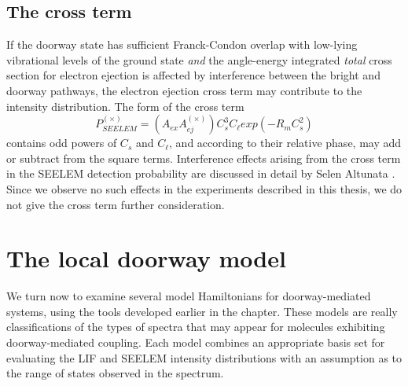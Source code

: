 \documentclass[12pt]{mitthesis}
\begin{document}
\subsection{The cross term}

If the doorway state has sufficient Franck-Condon overlap with
low-lying vibrational levels of the ground state \emph{and} the
angle-energy integrated \emph{total} cross section for electron
ejection is affected by interference between the bright and doorway
pathways, the electron ejection cross term may contribute to the
intensity distribution. The form of the cross term
\begin{equation}
  P_{SEELEM}^{(\times)} = \left( A_{ex} A_{ej}^{(\times)} \right)
    C_s^3 C_\ell exp \left( -R_m C_s^2 \right)
\end{equation}
contains odd powers of $C_s$ and $C_{\ell}$, and according to their
relative phase, may add or subtract from the square terms.
Interference effects arising from the cross term in the SEELEM
detection probability are discussed in detail by Selen Altunata
\cite{altunata00, altunata02, altunata-thesis}.  Since we observe no
such effects in the experiments described in this thesis, we do not
give the cross term further consideration.



\section{The local doorway model}
\label{sec:model-local}

We turn now to examine several model Hamiltonians for doorway-mediated
systems, using the tools developed earlier in the chapter.  These
models are really classifications of the types of spectra that may
appear for molecules exhibiting doorway-mediated coupling.  Each model
combines an appropriate basis set for evaluating the LIF and SEELEM
intensity distributions with an assumption as to the range of states
observed in the spectrum.
\end{document}
